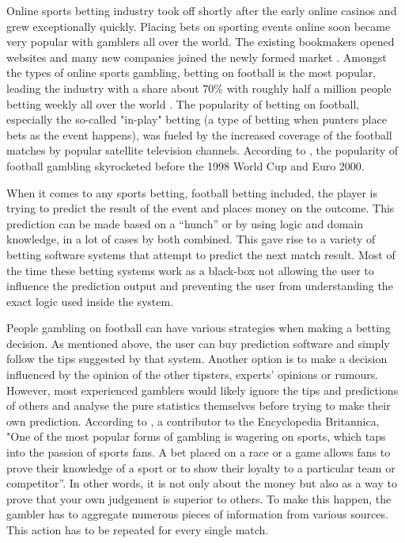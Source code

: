 Online sports betting industry took off shortly after the early online casinos and grew exceptionally quickly. Placing bets on sporting events online soon became very popular with gamblers all over the world. The existing bookmakers opened websites and many new companies joined the newly formed market \citep{source:gamblingsites}. Amongst the types of online sports gambling, betting on football is the most popular, leading the industry with a share about 70\% with roughly half a million people betting weekly all over the world \citep{footballbettinggamblingindustry}. The popularity of betting on football, especially the so-called "in-play" betting (a type of betting when punters place bets as the event happens), was fueled by the increased coverage of the football matches by popular satellite television channels. According to \citet{footballbettinggamblingindustry}, the popularity of football gambling skyrocketed before the 1998 World Cup and Euro 2000.

When it comes to any sports betting, football betting included, the player is trying to predict the result of the event and places money on the outcome. This prediction can be made based on a “hunch” or by using logic and domain knowledge, in a lot of cases by both combined. This gave rise to a variety of betting software systems that attempt to predict the next match result. Most of the time these betting systems work as a black-box not allowing the user to influence the prediction output and preventing the user from understanding the exact logic used inside the system.

People gambling on football can have various strategies when making a betting decision. As mentioned above, the user can buy prediction software and simply follow the tips suggested by that system. Another option is to make a decision influenced by the opinion of the other tipsters, experts’ opinions or rumours. However, most experienced gamblers would likely ignore the tips and predictions of others and analyse the pure statistics themselves before trying to make their own prediction. According to \citet{britannica2015gamblingandsports}, a contributor to the Encyclopedia Britannica, "One of the most popular forms of gambling is wagering on sports, which taps into the passion of sports fans. A bet placed on a race or a game allows fans to prove their knowledge of a sport or to show their loyalty to a particular team or competitor”. In other words, it is not only about the money but also as a way to prove that your own judgement is superior to others. To make this happen, the gambler has to aggregate numerous pieces of information from various sources. This action has to be repeated for every single match.

